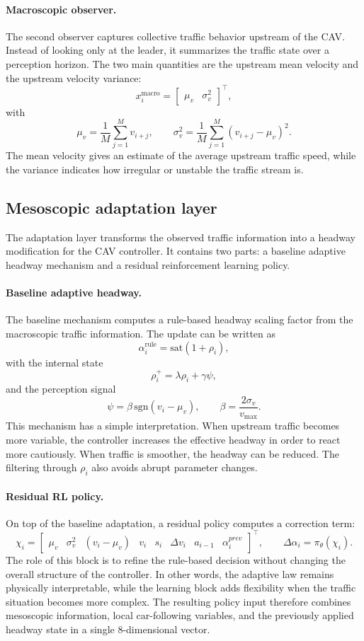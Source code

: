 \paragraph{Macroscopic observer.}
The second observer captures collective traffic behavior upstream of the CAV. Instead of looking only at the leader, it summarizes the traffic state over a perception horizon. The two main quantities are the upstream mean velocity and the upstream velocity variance:
\[
x_i^{\mathrm{macro}} =
\begin{bmatrix}
\mu_v & \sigma_v^2
\end{bmatrix}^{\top},
\]
with
\[
\mu_v = \frac{1}{M}\sum_{j=1}^{M} v_{i+j},
\qquad
\sigma_v^2 = \frac{1}{M}\sum_{j=1}^{M}(v_{i+j}-\mu_v)^2.
\]
The mean velocity gives an estimate of the average upstream traffic speed, while the variance indicates how irregular or unstable the traffic stream is.

\subsection{Mesoscopic adaptation layer}

The adaptation layer transforms the observed traffic information into a headway modification for the CAV controller. It contains two parts: a baseline adaptive headway mechanism and a residual reinforcement learning policy.

\paragraph{Baseline adaptive headway.}
The baseline mechanism computes a rule-based headway scaling factor from the macroscopic traffic information. The update can be written as
\[
\alpha_i^{\mathrm{rule}} = \mathrm{sat}(1+\rho_i),
\]
with the internal state
\[
\rho_i^{+} = \lambda \rho_i + \gamma \psi,
\]
and the perception signal
\[
\psi = \beta \,\mathrm{sgn}(v_i-\mu_v),
\qquad
\beta = \frac{2\sigma_v}{v_{\max}}.
\]
This mechanism has a simple interpretation. When upstream traffic becomes more variable, the controller increases the effective headway in order to react more cautiously. When traffic is smoother, the headway can be reduced. The filtering through $\rho_i$ also avoids abrupt parameter changes.

\paragraph{Residual RL policy.}
On top of the baseline adaptation, a residual policy computes a correction term:
\[
\chi_i =
\begin{bmatrix}
    \mu_v & \sigma_v^2 & (v_i-\mu_v) & v_i & s_i & \Delta v_i & a_{i-1} & \alpha_i^{prev}
\end{bmatrix}^{\top},
\qquad
\Delta \alpha_i = \pi_{\theta}(\chi_i).
\]
The role of this block is to refine the rule-based decision without changing the overall structure of the controller. In other words, the adaptive law remains physically interpretable, while the learning block adds flexibility when the traffic situation becomes more complex. The resulting policy input therefore combines mesoscopic information, local car-following variables, and the previously applied headway state in a single 8-dimensional vector.


